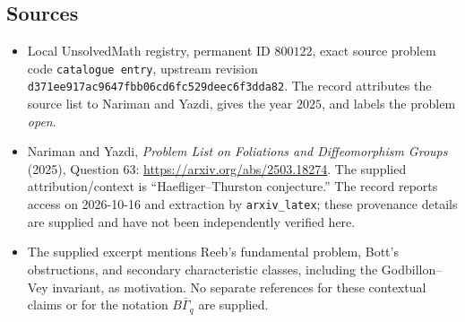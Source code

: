 \documentclass[11pt]{article}
\begin{document}
\subsection{Sources}
\begin{itemize}
\item Local UnsolvedMath registry, permanent ID $800122$, exact source problem code \texttt{catalogue entry}, upstream revision \texttt{d371ee917ac9647fbb06cd6fc529deec6f3dda82}. The record attributes the source list to Nariman and Yazdi, gives the year $2025$, and labels the problem \emph{open}.
\item Nariman and Yazdi, \emph{Problem List on Foliations and Diffeomorphism Groups} (2025), Question 63: \url{https://arxiv.org/abs/2503.18274}. The supplied attribution/context is ``Haefliger--Thurston conjecture.'' The record reports access on 2026-10-16 and extraction by \texttt{arxiv\_latex}; these provenance details are supplied and have not been independently verified here.
\item The supplied excerpt mentions Reeb's fundamental problem, Bott's obstructions, and secondary characteristic classes, including the Godbillon--Vey invariant, as motivation. No separate references for these contextual claims or for the notation $B\bar\Gamma_q$ are supplied.
\end{itemize}
\end{document}
